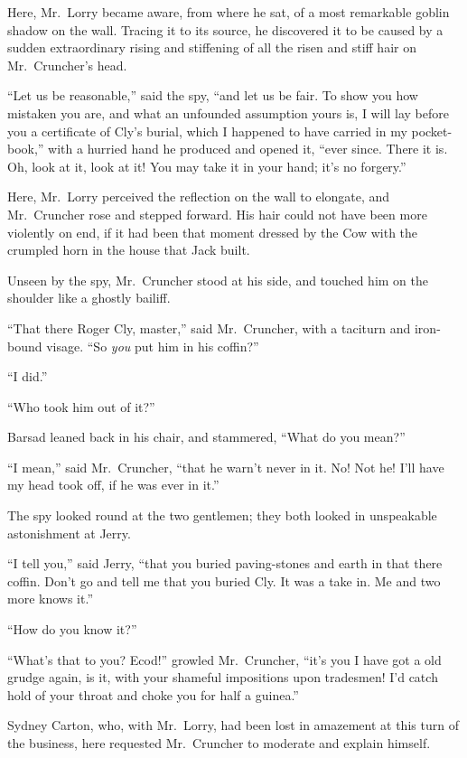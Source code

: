 Here, Mr.\ Lorry became aware, from where he sat, of a most remarkable
goblin shadow on the wall.  Tracing it to its source, he discovered
it to be caused by a sudden extraordinary rising and stiffening of
all the risen and stiff hair on Mr.\ Cruncher's head.

``Let us be reasonable,'' said the spy, ``and let us be fair.  To show
you how mistaken you are, and what an unfounded assumption yours is,
I will lay before you a certificate of Cly's burial, which I happened
to have carried in my pocket-book,'' with a hurried hand he produced
and opened it, ``ever since.  There it is.  Oh, look at it, look at it!
You may take it in your hand; it's no forgery.''

Here, Mr.\ Lorry perceived the reflection on the wall to elongate, and
Mr.\ Cruncher rose and stepped forward.  His hair could not have been
more violently on end, if it had been that moment dressed by the Cow
with the crumpled horn in the house that Jack built.

Unseen by the spy, Mr.\ Cruncher stood at his side, and touched him on
the shoulder like a ghostly bailiff.

``That there Roger Cly, master,'' said Mr.\ Cruncher, with a taciturn
and iron-bound visage.  ``So \emph{you} put him in his coffin?''

``I did.''

``Who took him out of it?''

Barsad leaned back in his chair, and stammered, ``What do you mean?''

``I mean,'' said Mr.\ Cruncher, ``that he warn't never in it.  No!  Not he!
I'll have my head took off, if he was ever in it.''

The spy looked round at the two gentlemen; they both looked in
unspeakable astonishment at Jerry.

``I tell you,'' said Jerry, ``that you buried paving-stones and earth in
that there coffin.  Don't go and tell me that you buried Cly.  It was
a take in. Me and two more knows it.''

``How do you know it?''

``What's that to you?  Ecod!'' growled Mr.\ Cruncher, ``it's you I have got
a old grudge again, is it, with your shameful impositions upon tradesmen!
I'd catch hold of your throat and choke you for half a guinea.''

Sydney Carton, who, with Mr.\ Lorry, had been lost in amazement at
this turn of the business, here requested Mr.\ Cruncher to moderate
and explain himself.

